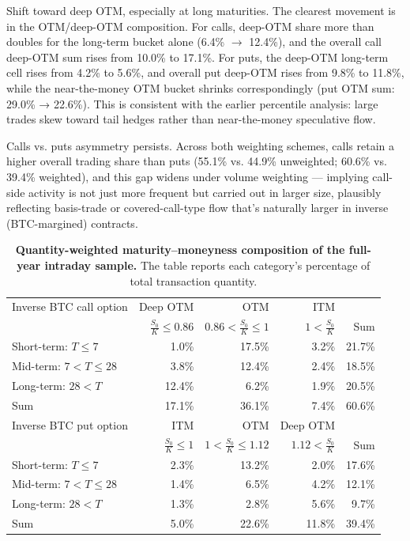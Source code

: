 \documentclass[11pt]{article}
\begin{document}
Shift toward deep OTM, especially at long maturities. The clearest movement is in the OTM/deep-OTM composition. For calls, deep-OTM share more than doubles for the long-term bucket alone (6.4\% $\to$ 12.4\%), and the overall call deep-OTM sum rises from 10.0\% to 17.1\%. For puts, the deep-OTM long-term cell rises from 4.2\% to 5.6\%, and overall put deep-OTM rises from 9.8\% to 11.8\%, while the near-the-money OTM bucket shrinks correspondingly (put OTM sum: 29.0\% → 22.6\%). This is consistent with the earlier percentile analysis: large trades skew toward tail hedges rather than near-the-money speculative flow.

Calls vs. puts asymmetry persists. Across both weighting schemes, calls retain a higher overall trading share than puts (55.1\% vs. 44.9\% unweighted; 60.6\% vs. 39.4\% weighted), and this gap widens under volume weighting — implying call-side activity is not just more frequent but carried out in larger size, plausibly reflecting basis-trade or covered-call-type flow that's naturally larger in inverse (BTC-margined) contracts.


\begin{table}[h]
\centering
\begin{tabular}{lrrrr}
\hline
Inverse BTC call option & Deep OTM & OTM & ITM & \\
 & $\frac{S_0}{K} \leq 0.86$ & $0.86 < \frac{S_0}{K} \leq 1$ & $1 < \frac{S_0}{K}$ & Sum \\
\hline
Short-term: $T \leq 7$ & 1.0\% & 17.5\% & 3.2\% & 21.7\% \\
Mid-term: $7 < T \leq 28$ & 3.8\% & 12.4\% & 2.4\% & 18.5\% \\
Long-term: $28 < T$ & 12.4\% & 6.2\% & 1.9\% & 20.5\% \\
Sum & 17.1\% & 36.1\% & 7.4\% & 60.6\% \\
\hline
Inverse BTC put option & ITM & OTM & Deep OTM & \\
 & $\frac{S_0}{K} \leq 1$ & $1 < \frac{S_0}{K} \leq 1.12$ &  $1.12 < \frac{S_0}{K}$ & Sum \\
\hline
Short-term: $T \leq 7$ & 2.3\% & 13.2\% & 2.0\% & 17.6\% \\
Mid-term: $7 < T \leq 28$ & 1.4\% & 6.5\% & 4.2\% & 12.1\% \\
Long-term: $28 < T$ & 1.3\% & 2.8\% & 5.6\% & 9.7\% \\
Sum & 5.0\% & 22.6\% & 11.8\% & 39.4\% \\
\hline
\end{tabular}
\caption{\textbf{Quantity-weighted maturity--moneyness composition of the full-year intraday sample.} The table reports each category's percentage of total transaction quantity.}
\label{tab:appendix_full_year_weighted_maturity_moneyness}
\end{table}
\end{document}
